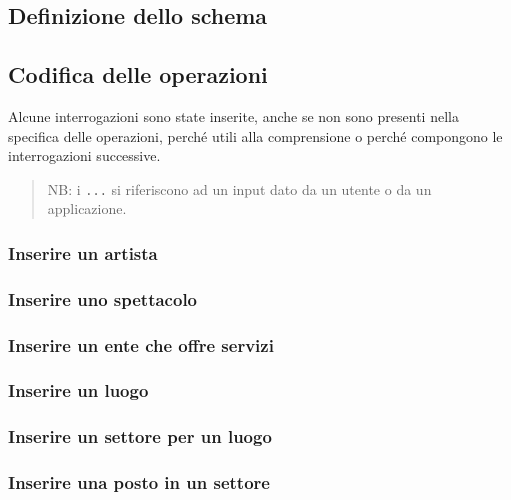 \documentclass[a4paper,11pt]{article}
\begin{document}
\subsection{Definizione dello schema}


\subsection{Codifica delle operazioni}
Alcune interrogazioni sono state inserite, anche se non sono presenti 
nella specifica delle operazioni, perché utili alla comprensione o perché
compongono le interrogazioni successive.

\begin{quote}
  NB: i \texttt{...} si riferiscono ad un input dato da un utente o da
  un applicazione.
\end{quote}

\subsubsection{Inserire un artista}


\subsubsection{Inserire uno spettacolo}


\subsubsection{Inserire un ente che offre servizi}


\subsubsection{Inserire un luogo}


\subsubsection{Inserire un settore per un luogo}


\subsubsection{Inserire una posto in un settore}

\end{document}
